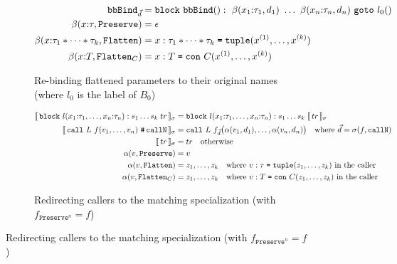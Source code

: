 \begin{figure}[htbp]
  \begin{subfigure}{\textwidth}
    \caption{Re-binding flattened parameters to their original names (where $l_0$ is the label of $B_0$)}
    \label{fig:preflatten_rebind_block}
    \[
    \begin{aligned}
      \mathtt{bbBind}_{\vec{d}}
        &= \mathtt{block\ bbBind}() :\ 
           \beta(x_1{:}\tau_1, d_1)\ \dots\ \beta(x_n{:}\tau_n, d_n)\ \mathtt{goto}\ l_0() \\
      \beta(x{:}\tau, \texttt{Preserve}) &= \epsilon \\
      \beta(x{:}\tau_1 * \cdots * \tau_k, \texttt{Flatten})
        &= x : \tau_1 * \cdots * \tau_k \syneq \mathtt{tuple}(x^{(1)}, \dots, x^{(k)}) \\
      \beta(x{:}T, \texttt{Flatten}_C)
        &= x : T \syneq \mathtt{con}\ C(x^{(1)}, \dots, x^{(k)})
    \end{aligned}
    \]
  \end{subfigure}

  \begin{subfigure}{\textwidth}
    \caption{Redirecting callers to the matching specialization (with $f_{\texttt{Preserve}^n} = f$)}
    \label{fig:preflatten_fix_call}
    \[
    \begin{aligned}
      \flatsem{\mathtt{block}\ l(x_1{:}\tau_1, \dots, x_n{:}\tau_n) : s_1 \dots s_k \; tr}
        &= \mathtt{block}\ l(x_1{:}\tau_1, \dots, x_n{:}\tau_n) : s_1 \dots s_k \; \flatsem{tr} \\
      \flatsem{\mathtt{call}\ L\ f(v_1, \dots, v_n)\ \texttt{\#\,callN}}
        &= \mathtt{call}\ L\ f_{\vec{d}}\big(\alpha(v_1, d_1), \dots, \alpha(v_n, d_n)\big)
           \quad \text{where } \vec{d} = \sigma(f, \texttt{callN}) \\
      \flatsem{tr} &= tr \quad \text{otherwise} \\
      \alpha(v, \texttt{Preserve}) &= v \\
      \alpha(v, \texttt{Flatten}) &= z_1, \dots, z_k
        \quad \text{where } v : \tau \syneq \mathtt{tuple}(z_1, \dots, z_k) \text{ in the caller} \\
      \alpha(v, \texttt{Flatten}_C) &= z_1, \dots, z_k
        \quad \text{where } v : T \syneq \mathtt{con}\ C(z_1, \dots, z_k) \text{ in the caller}
    \end{aligned}
    \]
  \end{subfigure}


\end{figure}
